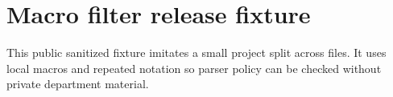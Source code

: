 \section{Macro filter release fixture}

This public sanitized fixture imitates a small project split across files. It uses
local macros and repeated notation so parser policy can be checked without private
department material.

\newcommand{\state}{x_t}
\newcommand{\meas}{y_t}
\newcommand{\trans}{F_t}
\newcommand{\obs}{H_t}
\newcommand{\innov}{v_t}
\newcommand{\cov}{S_t}



